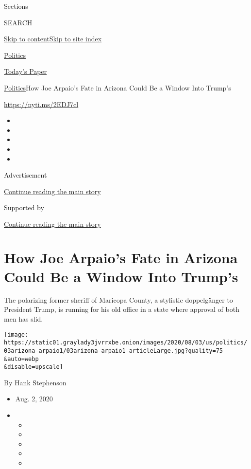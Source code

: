 Sections

SEARCH

\protect\hyperlink{site-content}{Skip to
content}\protect\hyperlink{site-index}{Skip to site index}

\href{https://www.nytimes3xbfgragh.onion/section/politics}{Politics}

\href{https://myaccount.nytimes3xbfgragh.onion/auth/login?response_type=cookie\&client_id=vi}{}

\href{https://www.nytimes3xbfgragh.onion/section/todayspaper}{Today's
Paper}

\href{/section/politics}{Politics}\textbar{}How Joe Arpaio's Fate in
Arizona Could Be a Window Into Trump's

\url{https://nyti.ms/2EDJ7cl}

\begin{itemize}
\item
\item
\item
\item
\item
\end{itemize}

Advertisement

\protect\hyperlink{after-top}{Continue reading the main story}

Supported by

\protect\hyperlink{after-sponsor}{Continue reading the main story}

\hypertarget{how-joe-arpaios-fate-in-arizona-could-be-a-window-into-trumps}{%
\section{How Joe Arpaio's Fate in Arizona Could Be a Window Into
Trump's}\label{how-joe-arpaios-fate-in-arizona-could-be-a-window-into-trumps}}

The polarizing former sheriff of Maricopa County, a stylistic
doppelgänger to President Trump, is running for his old office in a
state where approval of both men has slid.

\texttt{[image: https://static01.graylady3jvrrxbe.onion/images/2020/08/03/us/politics/03arizona-arpaio1/03arizona-arpaio1-articleLarge.jpg?quality=75\\\&auto=webp\\\&disable=upscale]}

By Hank Stephenson

\begin{itemize}
\item
  Aug. 2, 2020
\item
  \begin{itemize}
  \item
  \item
  \item
  \item
  \item
  \end{itemize}
\end{itemize}

